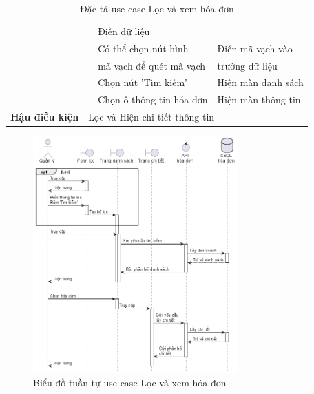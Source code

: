 \documentclass[../DoAn.tex]{subfiles}
\begin{document}
\begin{table}[H]
\begin{tabular}{|l|c|l|l|}
                                                &                                                                        & Điền dữ liệu                            &                                                 \\
                                                &                                                                        & Có thể chọn nút hình                    & Điền mã vạch vào                                \\
                                                &                                                                        & mã vạch để quét mã vạch                 & trường dữ liệu                                  \\ \cline{3-4}
                                                &                                                                        & Chọn nút 'Tìm kiếm'                     & Hiện màn danh sách                              \\ \cline{3-4}
                                                &                                                                        & Chọn ô thông tin hóa đơn                & Hiện màn thông tin                              \\ \hline
        \textbf{Hậu điều kiện}                  & \multicolumn{3}{l|}{Lọc và Hiện chi tiết thông tin}                                                                                                                \\ \hline
    \end{tabular}
    \caption{Đặc tả use case Lọc và xem hóa đơn}
    \label{table:uc-invoice-filter}
\end{table}
\begin{figure}[H]
    \centering
    \includegraphics[width=0.7\textwidth]{Hinhve/sequences/InvoiceFilter.png}
    \caption{Biểu đồ tuần tự use case Lọc và xem hóa đơn}
    \label{figure:sd-invoice-filter}
\end{figure}
\break
\end{document}
